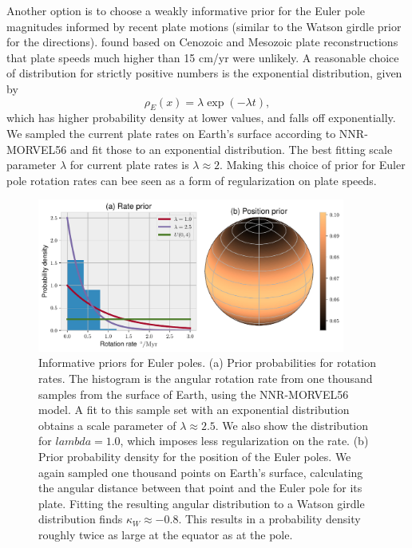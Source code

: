 \documentclass[preprint,12pt,authoryear]{elsarticle}
\begin{document}
Another option is to choose a weakly informative prior for the Euler pole magnitudes
informed by recent plate motions (similar to the Watson girdle prior for the directions).
\citet{zahirovic2015tectonic} found based on Cenozoic and Mesozoic plate reconstructions
that plate speeds much higher than 15 cm/yr were unlikely.
A reasonable choice of distribution for strictly positive numbers is the exponential distribution,
given by
\begin{equation}
\rho_E(x) = \lambda \exp(-\lambda t),
\end{equation}
which has higher probability density at lower values, and falls off exponentially.
We sampled the current plate rates on Earth's surface according to NNR-MORVEL56
and fit those to an exponential distribution. The best fitting scale parameter $\lambda$
for current plate rates is $\lambda\approx2$.
Making this choice of prior for Euler pole rotation rates can bee seen as a form
of regularization on plate speeds.

\begin{figure}
\includegraphics[width=0.9\textwidth]{figures/euler_pole_prior/euler_pole_prior.pdf}
\caption[Informative priors on Euler poles]{Informative priors for Euler poles. (a) Prior probabilities for rotation rates. The histogram is the angular rotation rate from one thousand samples from the surface of Earth, using the NNR-MORVEL56 model. A fit to this sample set with an exponential distribution obtains a scale parameter of $\lambda \approx 2.5$. We also show the distribution for $lambda = 1.0$, which imposes less regularization on the rate. (b) Prior probability density for the position of the Euler poles. We again sampled one thousand points on Earth's surface, calculating the angular distance between that point and the Euler pole for its plate. Fitting the resulting angular distribution to a Watson girdle distribution finds $\kappa_W \approx -0.8$. This results in a probability density roughly twice as large at the equator as at the pole.}
\label{fig:one_euler_pole}
\end{figure}
\end{document}

